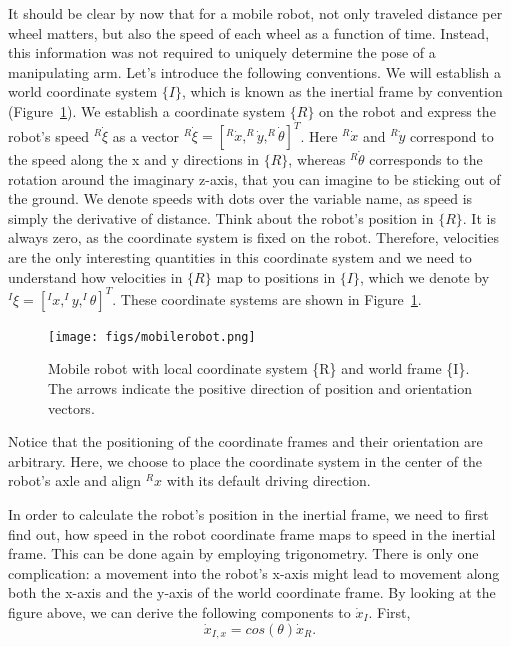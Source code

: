 It should be clear by now that for a mobile robot, not only traveled distance per wheel matters, but also the speed of each wheel as a function of time. Instead, this information was not required to uniquely determine the pose of a manipulating arm. Let's introduce the following conventions. We will establish a world coordinate system $\{I\}$, which is known as the inertial frame by convention (Figure~\ref{fig:mobilerobot}). We establish a coordinate system $\{R\}$ on the robot and express the robot's speed $^R\dot{\xi}$ as a vector $ ^R\dot{\xi}=[^R\dot{x}, ^R\dot{y}, ^R\dot{\theta}]^T$. Here $^R\dot{x}$ and $^R\dot{y}$ correspond to the speed along the x and y directions in $\{R\}$, whereas $^R\dot{\theta}$ corresponds to the rotation around the imaginary z-axis, that you can imagine to be sticking out of the ground. We denote speeds with dots over the variable name, as speed is simply the derivative of distance.  Think about the robot's position in $\{R\}$. It is always zero, as the coordinate system is fixed on the robot. Therefore, velocities are the only interesting quantities in this coordinate system and we need to understand how velocities in $\{R\}$ map to positions in $ \{I\}$, which we denote by $^I\xi=[^Ix, ^Iy, ^I\theta]^T$. These coordinate systems are shown in Figure~\ref{fig:mobilerobot}.

\begin{figure}[htb!]
	\centering
		\texttt{[image: figs/mobilerobot.png]}
	\caption{Mobile robot with local coordinate system \{R\} and world frame \{I\}. The arrows indicate the positive direction of position and orientation vectors.}
	\label{fig:mobilerobot}
\end{figure}



Notice that the positioning of the coordinate frames and their orientation are arbitrary. Here, we choose to place the coordinate system in the center of the robot's axle and align $^Rx$ with its default driving direction.

In order to calculate the robot's position in the inertial frame, we need to first find out, how speed in the robot coordinate frame maps to speed in the inertial frame. This can be done again by employing trigonometry. There is only one complication: a movement into the robot's x-axis might lead to movement along both the x-axis and the y-axis of the world coordinate frame. By looking at the figure above, we can derive the following components to $\dot{x}_I$. First,
\begin{equation}
\dot{x}_{I,x}=cos(\theta) \dot{x}_R.
\end{equation}

